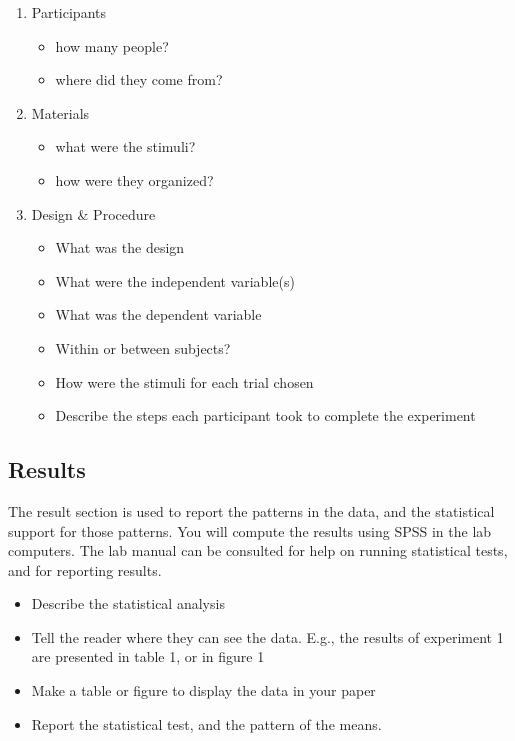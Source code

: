 \begin{enumerate}
\item Participants
	\begin{itemize}
	\item how many people?
	\item where did they come from?
	\end{itemize}
\item Materials
	\begin{itemize}
	\item what were the stimuli?
	\item how were they organized?
	\end{itemize}

\item Design \& Procedure
	\begin{itemize}
	\item What was the design
	\item What were the independent variable(s)
	\item What was the dependent variable
	\item Within or between subjects?
	\item How were the stimuli for each trial chosen
	\item Describe the steps each participant took to complete the experiment
	\end{itemize}

\end{enumerate}

\subsection{Results}

The result section is used to report the patterns in the data, and the statistical support for those patterns. You will compute the results using SPSS in the lab computers. The lab manual can be consulted for help on running statistical tests, and for reporting results.

\begin{itemize}
\item Describe the statistical analysis
\item Tell the reader where they can see the data. E.g., the results of experiment 1 are presented in table 1, or in figure 1
\item Make a table or figure to display the data in your paper
\item Report the statistical test, and the pattern of the means.
\end{itemize}

